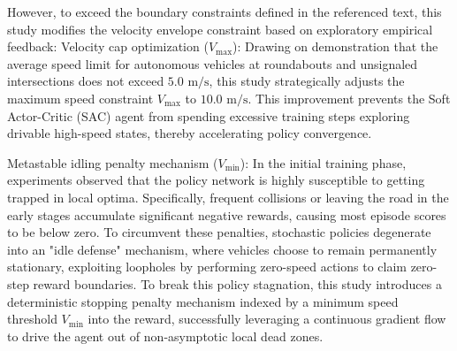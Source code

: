     However, to exceed the boundary constraints defined in the referenced text, this study modifies the velocity envelope constraint based on exploratory empirical feedback: Velocity cap optimization ($V_{\max}$): Drawing on \cite{elallid_improving_2024} demonstration that the average speed limit for autonomous vehicles at roundabouts and unsignaled intersections does not exceed $5.0 \text{ m/s}$, this study strategically adjusts the maximum speed constraint $V_{\max}$ to $10.0 \text{ m/s}$. This improvement prevents the Soft Actor-Critic (SAC) agent from spending excessive training steps exploring drivable high-speed states, thereby accelerating policy convergence.

    Metastable idling penalty mechanism ($V_{\min}$): In the initial training phase, experiments observed that the policy network is highly susceptible to getting trapped in local optima. Specifically, frequent collisions or leaving the road in the early stages accumulate significant negative rewards, causing most episode scores to be below zero. To circumvent these penalties, stochastic policies degenerate into an "idle defense" mechanism, where vehicles choose to remain permanently stationary, exploiting loopholes by performing zero-speed actions to claim zero-step reward boundaries. To break this policy stagnation, this study introduces a deterministic stopping penalty mechanism indexed by a minimum speed threshold $V_{\min}$ into the reward, successfully leveraging a continuous gradient flow to drive the agent out of non-asymptotic local dead zones.